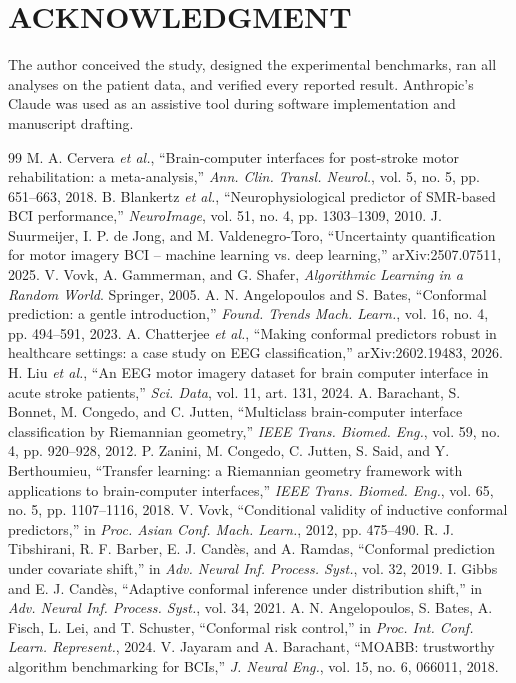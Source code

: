 \documentclass[letterpaper, 10pt, conference]{ieeeconf}
\begin{document}
\section*{ACKNOWLEDGMENT}
The author conceived the study, designed the experimental benchmarks, ran all
analyses on the patient data, and verified every reported result. Anthropic's
Claude was used as an assistive tool during software implementation and
manuscript drafting.

\footnotesize
\begin{thebibliography}{99}
 M. A. Cervera \emph{et al.}, ``Brain-computer interfaces
for post-stroke motor rehabilitation: a meta-analysis,'' \emph{Ann. Clin. Transl.
Neurol.}, vol. 5, no. 5, pp. 651--663, 2018.
 B. Blankertz \emph{et al.}, ``Neurophysiological
predictor of SMR-based BCI performance,'' \emph{NeuroImage}, vol. 51, no. 4,
pp. 1303--1309, 2010.
 J. Suurmeijer, I. P. de Jong, and M. Valdenegro-Toro, ``Uncertainty quantification for motor
imagery BCI -- machine learning vs. deep learning,'' arXiv:2507.07511, 2025.
 V. Vovk, A. Gammerman, and G. Shafer, \emph{Algorithmic
Learning in a Random World}. Springer, 2005.
 A. N. Angelopoulos and S. Bates, ``Conformal
prediction: a gentle introduction,'' \emph{Found. Trends Mach. Learn.}, vol. 16,
no. 4, pp. 494--591, 2023.
 A. Chatterjee \emph{et al.}, ``Making conformal predictors robust
in healthcare settings: a case study on EEG classification,'' arXiv:2602.19483,
2026.
 H. Liu \emph{et al.}, ``An EEG motor imagery dataset for brain
computer interface in acute stroke patients,'' \emph{Sci. Data}, vol. 11,
art. 131, 2024.
 A. Barachant, S. Bonnet, M. Congedo, and C. Jutten,
``Multiclass brain-computer interface classification by Riemannian geometry,''
\emph{IEEE Trans. Biomed. Eng.}, vol. 59, no. 4, pp. 920--928, 2012.
 P. Zanini, M. Congedo, C. Jutten, S. Said, and
Y. Berthoumieu, ``Transfer learning: a Riemannian geometry framework with
applications to brain-computer interfaces,'' \emph{IEEE Trans. Biomed. Eng.},
vol. 65, no. 5, pp. 1107--1116, 2018.
 V. Vovk, ``Conditional validity of inductive conformal
predictors,'' in \emph{Proc. Asian Conf. Mach. Learn.}, 2012, pp. 475--490.
 R. J. Tibshirani, R. F. Barber, E. J. Cand\`es, and
A. Ramdas, ``Conformal prediction under covariate shift,'' in \emph{Adv. Neural
Inf. Process. Syst.}, vol. 32, 2019.
 I. Gibbs and E. J. Cand\`es, ``Adaptive conformal inference
under distribution shift,'' in \emph{Adv. Neural Inf. Process. Syst.}, vol. 34,
2021.
 A. N. Angelopoulos, S. Bates, A. Fisch, L. Lei, and
T. Schuster, ``Conformal risk control,'' in \emph{Proc. Int. Conf. Learn.
Represent.}, 2024.
 V. Jayaram and A. Barachant, ``MOABB: trustworthy
algorithm benchmarking for BCIs,'' \emph{J. Neural Eng.}, vol. 15, no. 6,
066011, 2018.
\end{thebibliography}
\end{document}
